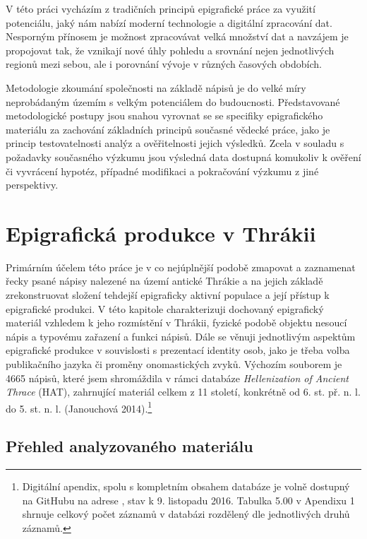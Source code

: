 V této práci vycházím z tradičních principů epigrafické práce za využití potenciálu, jaký nám nabízí moderní technologie a digitální zpracování dat. Nesporným přínosem je možnost zpracovávat velká množství dat a navzájem je propojovat tak, že vznikají nové úhly pohledu a srovnání nejen jednotlivých regionů mezi sebou, ale i porovnání vývoje v různých časových obdobích.

Metodologie zkoumání společnosti na základě nápisů je do velké míry neprobádaným územím s velkým potenciálem do budoucnosti. Představované metodologické postupy jsou snahou vyrovnat se se specifiky epigrafického materiálu za zachování základních principů současné vědecké práce, jako je princip testovatelnosti analýz a ověřitelnosti jejich výsledků. Zcela v souladu s požadavky současného výzkumu jsou výsledná data dostupná komukoliv k ověření či vyvrácení hypotéz, případné modifikaci a pokračování výzkumu z jiné perspektivy.

\chapter{Epigrafická produkce v Thrákii}
Primárním účelem této práce je v co nejúplnější podobě zmapovat a zaznamenat řecky psané nápisy nalezené na území antické Thrákie a na jejich základě zrekonstruovat složení tehdejší epigraficky aktivní populace a její přístup k epigrafické produkci. V této kapitole charakterizuji dochovaný epigrafický materiál vzhledem k jeho rozmístění v Thrákii, fyzické podobě objektu nesoucí nápis a typovému zařazení a funkci nápisů. Dále se věnuji jednotlivým aspektům epigrafické produkce v souvislosti s prezentací identity osob, jako je třeba volba publikačního jazyka či proměny onomastických zvyků. Výchozím souborem je 4665 nápisů, které jsem shromáždila v rámci databáze {\em Hellenization of Ancient Thrace} (HAT), zahrnující materiál celkem z 11 století, konkrétně od 6. st. př. n. l. do 5. st. n. l. (Janouchová 2014).\footnote{Digitální apendix, spolu s kompletním obsahem databáze je volně dostupný na GitHubu na adrese \from[url19], stav k 9. listopadu 2016. Tabulka 5.00 v Apendixu 1 shrnuje celkový počet záznamů v databázi rozdělený dle jednotlivých druhů záznamů.}

\section[přehled-analyzovaného-materiálu]{Přehled analyzovaného materiálu}


